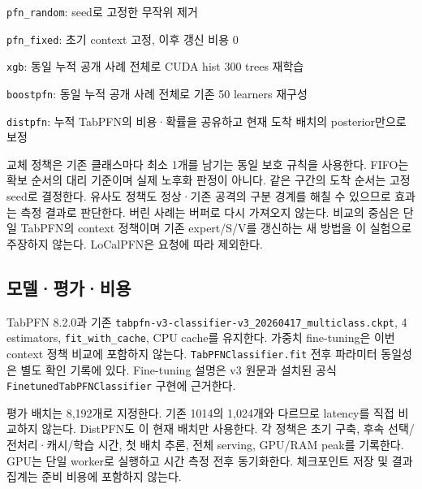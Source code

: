 \par\noindent \textbullet\enspace \texttt{pfn\_\allowbreak{}\allowbreak{}rand\allowbreak{}om}: seed로 고정한 무작위 제거


\par\noindent \textbullet\enspace \texttt{pfn\_\allowbreak{}\allowbreak{}fixe\allowbreak{}d}: 초기 context 고정, 이후 갱신 비용 0


\par\noindent \textbullet\enspace \texttt{xgb}: 동일 누적 공개 사례 전체로 CUDA hist 300 trees 재학습


\par\noindent \textbullet\enspace \texttt{boostpfn\allowbreak{}}: 동일 누적 공개 사례 전체로 기존 50 learners 재구성


\par\noindent \textbullet\enspace \texttt{distpfn}: 누적 TabPFN의 비용·확률을 공유하고 현재 도착 배치의 posterior만으로 보정


교체 정책은 기존 클래스마다 최소 1개를 남기는 동일 보호 규칙을 사용한다. FIFO는 확보 순서의 대리 기준이며 실제 노후화 판정이 아니다. 같은 구간의 도착 순서는 고정 seed로 결정한다. 유사도 정책도 정상·기존 공격의 구분 경계를 해칠 수 있으므로 효과는 측정 결과로 판단한다. 버린 사례는 버퍼로 다시 가져오지 않는다. 비교의 중심은 단일 TabPFN의 context 정책이며 기존 expert/\allowbreak{}S/\allowbreak{}V를 갱신하는 새 방법을 이 실험으로 주장하지 않는다. LoCalPFN은 요청에 따라 제외한다.

\subsection{모델·평가·비용}
TabPFN 8.2.0과 기존 \texttt{tabpfn-\allowbreak{}v\allowbreak{}3-\allowbreak{}classi\allowbreak{}fier-\allowbreak{}v3\_\allowbreak{}\allowbreak{}20260417\allowbreak{}\_\allowbreak{}\allowbreak{}multicl\allowbreak{}ass.\allowbreak{}ckpt\allowbreak{}}, 4 estimators, \texttt{fit\_\allowbreak{}\allowbreak{}with\allowbreak{}\_\allowbreak{}\allowbreak{}cache}, CPU cache를 유지한다. 가중치 fine-tuning은 이번 context 정책 비교에 포함하지 않는다. \texttt{TabPFNCl\allowbreak{}assifier\allowbreak{}.\allowbreak{}fit} 전후 파라미터 동일성은 별도 확인 기록에 있다. Fine-tuning 설명은 v3 원문과 설치된 공식 \texttt{Finetune\allowbreak{}dTabPFNC\allowbreak{}lassifie\allowbreak{}r} 구현에 근거한다.

평가 배치는 8,192개로 지정한다. 기존 1014의 1,024개와 다르므로 latency를 직접 비교하지 않는다. DistPFN도 이 현재 배치만 사용한다. 각 정책은 초기 구축, 후속 선택/\allowbreak{}전처리·캐시/\allowbreak{}학습 시간, 첫 배치 추론, 전체 serving, GPU/\allowbreak{}RAM peak를 기록한다. GPU는 단일 worker로 실행하고 시간 측정 전후 동기화한다. 체크포인트 저장 및 결과 집계는 준비 비용에 포함하지 않는다.

